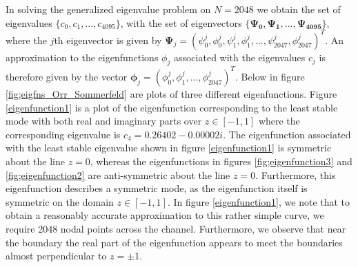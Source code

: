 \documentclass[a4paper, 12pt, twoside, openright]{article}
\numberwithin{equation}{section}
\begin{document}
In solving the generalized eigenvalue problem on $N=2048$ we obtain the set of eigenvalues $\{c_0,c_1,...,c_{4095}\}$, with the set of eigenvectors $\{\mathbf{\Psi_0},\mathbf{\Psi_1},...,\mathbf{\Psi_{4095}}\}$, where the $j$th eigenvector is given by $\mathbf{\Psi}_j = \left(\psi^{j}_0,\phi^{j}_0,\psi^{j}_1, \phi^{j}_1,...,\psi^{j}_{2047},\phi^{j}_{2047}\right)^{T}$. An approximation to the eigenfunctions $\phi_j$ associated with the eigenvalues $c_j$ is therefore given by the vector $\mathbf{\phi}_j = \left(\phi^{j}_0, \phi^{j}_1,...,\phi^{j}_{2047}\right)^{T}$. Below in figure \ref{fig;eigfns_Orr_Sommerfeld} are plots of three different eigenfunctions. Figure \ref{eigenfunction1} is a plot of the eigenfunction corresponding to the least stable mode with both real and imaginary parts over $z\in\left[-1,1\right]$ where the corresponding eigenvalue is $c_4=0.26402-0.00002i$. The eigenfunction associated with the least stable eigenvalue shown in figure \ref{eigenfunction1} is symmetric about the line $z=0$, whereas the eigenfunctions in figures \ref{fig;eigenfunction3} and \ref{fig;eigenfunction2} are anti-symmetric about the line $z=0$. Furthermore, this eigenfunction describes a symmetric mode, as the eigenfunction itself is symmetric on the domain $z\in\left[-1,1\right]$. In figure \ref{eigenfunction1}, we note that to obtain a reasonably accurate approximation to this rather simple curve, we require 2048 nodal points across the channel. Furthermore, we observe that near the boundary the real part of the eigenfunction appears to meet the boundaries almost perpendicular to $z=\pm1$.   
    
\end{document}

